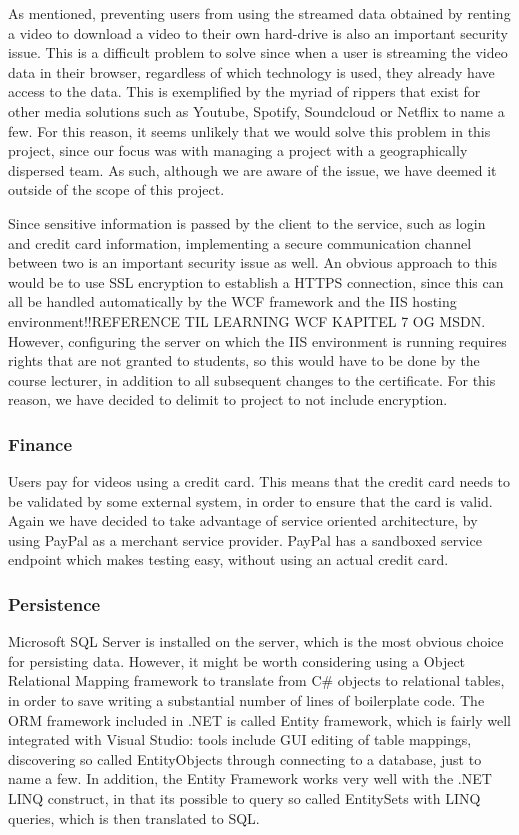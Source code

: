 As mentioned, preventing users from using the streamed data obtained by renting a video to download a video to their own hard-drive is also an important security issue. This is a difficult problem to solve since when a user is streaming the video data in their browser, regardless of which technology is used, they already have access to the data. This is exemplified by the myriad of rippers that exist for other media solutions such as Youtube, Spotify, Soundcloud or Netflix to name a few. For this reason, it seems unlikely that we would solve this problem in this project, since our focus was with managing a project with a geographically dispersed team. As such, although we are aware of the issue, we have deemed it outside of the scope of this project.

Since sensitive information is passed by the client to the service, such as login and credit card information, implementing a secure communication channel between two is an important security issue as well. An obvious approach to this would be to use SSL encryption to establish a HTTPS connection, since this can all be handled automatically by the WCF framework and the IIS hosting environment!!REFERENCE TIL LEARNING WCF KAPITEL 7 OG MSDN. However, configuring the server on which  the IIS environment is running requires rights that are not granted to students, so this would have to be done by the course lecturer, in addition to all subsequent changes to the certificate. For this reason, we have decided to delimit to project to not include encryption.

\subsubsection{Finance} \label{Paypal}
Users pay for videos using a credit card. This means that the credit card needs to be validated by some external system, in order to ensure that the card is valid. Again we have decided to take advantage of service oriented architecture, by using PayPal as a merchant service provider. PayPal has a sandboxed service endpoint which makes testing easy, without using an actual credit card.

\subsubsection{Persistence}
Microsoft SQL Server is installed on the server, which is the most obvious choice for persisting data. However, it might be worth considering using a Object Relational Mapping framework to translate from C\# objects to relational tables, in order to save writing a substantial number of lines of boilerplate code. The ORM framework included in .NET is called Entity framework, which is fairly well integrated with Visual Studio: tools include GUI editing of table mappings, discovering so called EntityObjects through connecting to a database, just to name a few. In addition, the Entity Framework works very well with the .NET LINQ construct, in that its possible to query so called EntitySets with LINQ queries, which is then translated to SQL.

